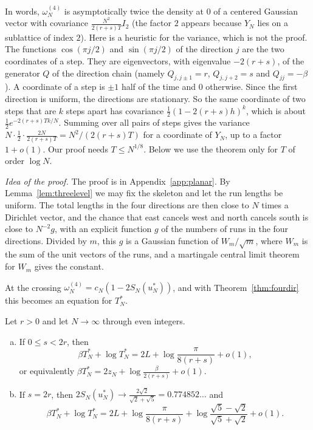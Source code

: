 In words, $\omega^{(4)}_N$ is asymptotically twice the density at $0$ of a centered Gaussian vector with covariance
$\frac{N^2}{2(r+s)T}I_2$ (the factor $2$ appears because $Y_N$ lies on a sublattice of index $2$).
Here is a heuristic for the variance, which is not the proof. The functions $\cos(\pi j/2)$ and $\sin(\pi j/2)$ of the
direction $j$ are the two coordinates of a step. They are eigenvectors, with eigenvalue
$-2(r+s)$, of the generator $Q$ of the direction chain (namely $Q_{j,j\pm1}=r$, $Q_{j,j+2}=s$ and
$Q_{jj}=-\beta$). A coordinate of a step is $\pm1$ half of the time and $0$ otherwise. Since the
first direction is uniform, the directions are stationary. So the same coordinate of two steps
that are $k$ steps apart has covariance
$\frac12(1-2(r+s)h)^k$, which is about $\frac12e^{-2(r+s)Tk/N}$. Summing over all pairs of steps
gives the variance $N\cdot\frac12\cdot\frac{2N}{2(r+s)T}=N^2/(2(r+s)T)$ for a coordinate of $Y_N$,
up to a factor $1+o(1)$. Our proof needs $T\le N^{1/8}$. Below we use the theorem only for $T$
of order $\log N$.

\emph{Idea of the proof.} The proof is in Appendix~\ref{app:planar}. By
Lemma~\ref{lem:threelevel} we may fix the skeleton and let the run lengths be uniform. The total
lengths in the four directions are then close to $N$ times a Dirichlet vector, and the chance that
east cancels west and north cancels south is close to $N^{-2}g$, with an explicit function $g$ of
the numbers of runs in the four directions. Divided by $m$, this $g$ is a Gaussian function of
$W_m/\sqrt m$, where $W_m$ is the sum of the unit vectors of the runs, and a martingale central limit
theorem for $W_m$ gives the constant.

At the crossing $\omega^{(4)}_N=c_N(1-2S_N(u^*_N))$, and with Theorem~\ref{thm:fourdir} this becomes
an equation for $T^*_N$.

\begin{corollary}\label{cor:planar-turn}
Let $r>0$ and let $N\to\infty$ through even integers.
\begin{enumerate}[(a)]
\item If $0\le s<2r$, then
\[
 \beta T^*_N+\log T^*_N=2L+\log\frac\pi{8(r+s)}+o(1),
\]
or equivalently $\beta T^*_N=2z_N+\log\frac\beta{2(r+s)}+o(1)$.
\item If $s=2r$, then $2S_N(u^*_N)\to\frac{2\sqrt2}{\sqrt2+\sqrt5}=0.774852\ldots$ and
\[
 \beta T^*_N+\log T^*_N=2L+\log\frac\pi{8(r+s)}
 +\log\frac{\sqrt5-\sqrt2}{\sqrt5+\sqrt2}+o(1).
\]
\end{enumerate}
\end{corollary}

